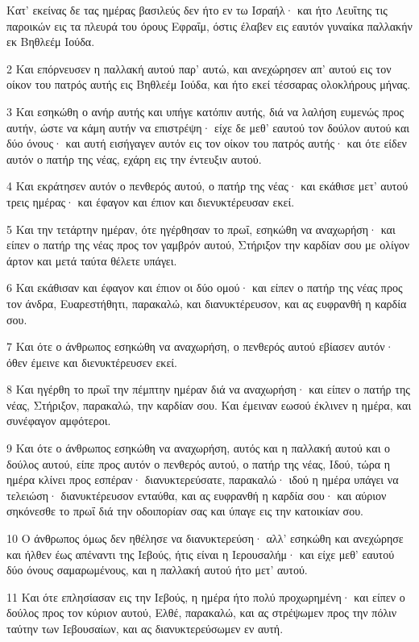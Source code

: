 \par Κατ' εκείνας δε τας ημέρας βασιλεύς δεν ήτο εν τω Ισραήλ· και ήτο Λευΐτης τις παροικών εις τα πλευρά του όρους Εφραΐμ, όστις έλαβεν εις εαυτόν γυναίκα παλλακήν εκ Βηθλεέμ Ιούδα.
\par 2 Και επόρνευσεν η παλλακή αυτού παρ' αυτώ, και ανεχώρησεν απ' αυτού εις τον οίκον του πατρός αυτής εις Βηθλεέμ Ιούδα, και ήτο εκεί τέσσαρας ολοκλήρους μήνας.
\par 3 Και εσηκώθη ο ανήρ αυτής και υπήγε κατόπιν αυτής, διά να λαλήση ευμενώς προς αυτήν, ώστε να κάμη αυτήν να επιστρέψη· είχε δε μεθ' εαυτού τον δούλον αυτού και δύο όνους· και αυτή εισήγαγεν αυτόν εις τον οίκον του πατρός αυτής· και ότε είδεν αυτόν ο πατήρ της νέας, εχάρη εις την έντευξιν αυτού.
\par 4 Και εκράτησεν αυτόν ο πενθερός αυτού, ο πατήρ της νέας· και εκάθισε μετ' αυτού τρεις ημέρας· και έφαγον και έπιον και διενυκτέρευσαν εκεί.
\par 5 Και την τετάρτην ημέραν, ότε ηγέρθησαν το πρωΐ, εσηκώθη να αναχωρήση· και είπεν ο πατήρ της νέας προς τον γαμβρόν αυτού, Στήριξον την καρδίαν σου με ολίγον άρτον και μετά ταύτα θέλετε υπάγει.
\par 6 Και εκάθισαν και έφαγον και έπιον οι δύο ομού· και είπεν ο πατήρ της νέας προς τον άνδρα, Ευαρεστήθητι, παρακαλώ, και διανυκτέρευσον, και ας ευφρανθή η καρδία σου.
\par 7 Και ότε ο άνθρωπος εσηκώθη να αναχωρήση, ο πενθερός αυτού εβίασεν αυτόν· όθεν έμεινε και διενυκτέρευσεν εκεί.
\par 8 Και ηγέρθη το πρωΐ την πέμπτην ημέραν διά να αναχωρήση· και είπεν ο πατήρ της νέας, Στήριξον, παρακαλώ, την καρδίαν σου. Και έμειναν εωσού έκλινεν η ημέρα, και συνέφαγον αμφότεροι.
\par 9 Και ότε ο άνθρωπος εσηκώθη να αναχωρήση, αυτός και η παλλακή αυτού και ο δούλος αυτού, είπε προς αυτόν ο πενθερός αυτού, ο πατήρ της νέας, Ιδού, τώρα η ημέρα κλίνει προς εσπέραν· διανυκτερεύσατε, παρακαλώ· ιδού η ημέρα υπάγει να τελειώση· διανυκτέρευσον ενταύθα, και ας ευφρανθή η καρδία σου· και αύριον σηκόνεσθε το πρωΐ διά την οδοιπορίαν σας και ύπαγε εις την κατοικίαν σου.
\par 10 Ο άνθρωπος όμως δεν ηθέλησε να διανυκτερεύση· αλλ' εσηκώθη και ανεχώρησε και ήλθεν έως απέναντι της Ιεβούς, ήτις είναι η Ιερουσαλήμ· και είχε μεθ' εαυτού δύο όνους σαμαρωμένους, και η παλλακή αυτού ήτο μετ' αυτού.
\par 11 Και ότε επλησίασαν εις την Ιεβούς, η ημέρα ήτο πολύ προχωρημένη· και είπεν ο δούλος προς τον κύριον αυτού, Ελθέ, παρακαλώ, και ας στρέψωμεν προς την πόλιν ταύτην των Ιεβουσαίων, και ας διανυκτερεύσωμεν εν αυτή.
